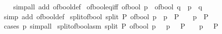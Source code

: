 \begin{isabellebody}
%
\isadelimproof
\ \ %
\endisadelimproof
%
\isatagproof
{}\isamarkupfalse%
\ {\isacharparenleft}{\kern0pt}simp{\isacharunderscore}{\kern0pt}all\ add{\isacharcolon}{\kern0pt}\ of{\isacharunderscore}{\kern0pt}bool{\isacharunderscore}{\kern0pt}def{\isacharparenright}{\kern0pt}%
\endisatagproof
{\isafoldproof}%
%
\isadelimproof
\isanewline
%
\endisadelimproof
\isanewline
{}\isamarkupfalse%
\ of{\isacharunderscore}{\kern0pt}bool{\isacharunderscore}{\kern0pt}eq{\isacharunderscore}{\kern0pt}iff{\isacharcolon}{\kern0pt}\ {\isachardoublequoteopen}of{\isacharunderscore}{\kern0pt}bool\ p\ {\isacharequal}{\kern0pt}\ of{\isacharunderscore}{\kern0pt}bool\ q\ {\isasymlongleftrightarrow}\ p\ {\isacharequal}{\kern0pt}\ q{\isachardoublequoteclose}\isanewline
%
\isadelimproof
\ \ %
\endisadelimproof
%
\isatagproof
{}\isamarkupfalse%
\ {\isacharparenleft}{\kern0pt}simp\ add{\isacharcolon}{\kern0pt}\ of{\isacharunderscore}{\kern0pt}bool{\isacharunderscore}{\kern0pt}def{\isacharparenright}{\kern0pt}%
\endisatagproof
{\isafoldproof}%
%
\isadelimproof
\isanewline
%
\endisadelimproof
\isanewline
{}\isamarkupfalse%
\ split{\isacharunderscore}{\kern0pt}of{\isacharunderscore}{\kern0pt}bool\ {\isacharbrackleft}{\kern0pt}split{\isacharbrackright}{\kern0pt}{\isacharcolon}{\kern0pt}\ {\isachardoublequoteopen}P\ {\isacharparenleft}{\kern0pt}of{\isacharunderscore}{\kern0pt}bool\ p{\isacharparenright}{\kern0pt}\ {\isasymlongleftrightarrow}\ {\isacharparenleft}{\kern0pt}p\ {\isasymlongrightarrow}\ P\ {}{\isacharparenright}{\kern0pt}\ {\isasymand}\ {\isacharparenleft}{\kern0pt}{\isasymnot}\ p\ {\isasymlongrightarrow}\ P\ {}{\isacharparenright}{\kern0pt}{\isachardoublequoteclose}\isanewline
%
\isadelimproof
\ \ %
\endisadelimproof
%
\isatagproof
{}\isamarkupfalse%
\ {\isacharparenleft}{\kern0pt}cases\ p{\isacharparenright}{\kern0pt}\ simp{\isacharunderscore}{\kern0pt}all%
\endisatagproof
{\isafoldproof}%
%
\isadelimproof
\isanewline
%
\endisadelimproof
\isanewline
{}\isamarkupfalse%
\ split{\isacharunderscore}{\kern0pt}of{\isacharunderscore}{\kern0pt}bool{\isacharunderscore}{\kern0pt}asm\ {\isacharbrackleft}{\kern0pt}split{\isacharbrackright}{\kern0pt}{\isacharcolon}{\kern0pt}\ {\isachardoublequoteopen}P\ {\isacharparenleft}{\kern0pt}of{\isacharunderscore}{\kern0pt}bool\ p{\isacharparenright}{\kern0pt}\ {\isasymlongleftrightarrow}\ {\isasymnot}\ {\isacharparenleft}{\kern0pt}p\ {\isasymand}\ {\isasymnot}\ P\ {}\ {\isasymor}\ {\isasymnot}\ p\ {\isasymand}\ {\isasymnot}\ P\ {}{\isacharparenright}{\kern0pt}{\isachardoublequoteclose}\isanewline

\end{isabellebody}
